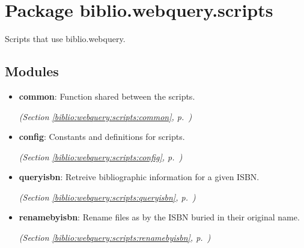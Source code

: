 %
%
%


\section{Package biblio.webquery.scripts}

    \label{biblio:webquery:scripts}

Scripts that use biblio.webquery.


\subsection{Modules}

\begin{itemize}
\setlength{\parskip}{0ex}
\item \textbf{common}: 
Function shared between the scripts.


  \textit{(Section \ref{biblio:webquery:scripts:common}, p.~\pageref{biblio:webquery:scripts:common})}

\item \textbf{config}: 
Constants and definitions for scripts.


  \textit{(Section \ref{biblio:webquery:scripts:config}, p.~\pageref{biblio:webquery:scripts:config})}

\item \textbf{queryisbn}: 
Retreive bibliographic information for a given ISBN.


  \textit{(Section \ref{biblio:webquery:scripts:queryisbn}, p.~\pageref{biblio:webquery:scripts:queryisbn})}

\item \textbf{renamebyisbn}: 
Rename files as by the ISBN buried in their original name.


  \textit{(Section \ref{biblio:webquery:scripts:renamebyisbn}, p.~\pageref{biblio:webquery:scripts:renamebyisbn})}

\end{itemize}

